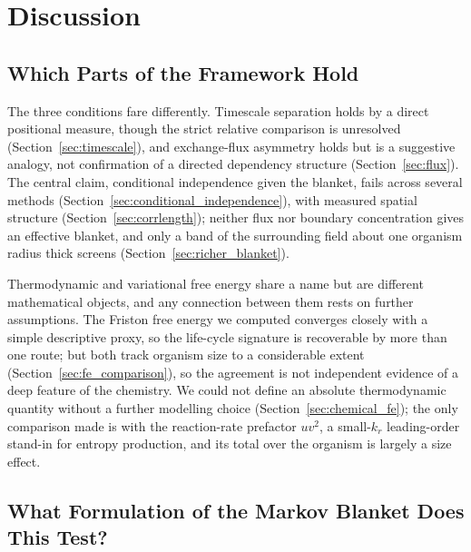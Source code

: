 \documentclass[11pt]{article}
\begin{document}
\section{Discussion}
\label{sec:discussion}

\subsection{Which Parts of the Framework Hold}

The three conditions fare differently. Timescale separation holds by a direct positional measure, though the strict relative comparison is unresolved (Section~\ref{sec:timescale}), and exchange-flux asymmetry holds but is a suggestive analogy, not confirmation of a directed dependency structure (Section~\ref{sec:flux}). The central claim, conditional independence given the blanket, fails across several methods (Section~\ref{sec:conditional_independence}), with measured spatial structure (Section~\ref{sec:corrlength}); neither flux nor boundary concentration gives an effective blanket, and only a band of the surrounding field about one organism radius thick screens (Section~\ref{sec:richer_blanket}).

Thermodynamic and variational free energy share a name but are different mathematical objects, and any connection between them rests on further assumptions. The Friston free energy we computed converges closely with a simple descriptive proxy, so the life-cycle signature is recoverable by more than one route; but both track organism size to a considerable extent (Section~\ref{sec:fe_comparison}), so the agreement is not independent evidence of a deep feature of the chemistry. We could not define an absolute thermodynamic quantity without a further modelling choice (Section~\ref{sec:chemical_fe}); the only comparison made is with the reaction-rate prefactor $uv^2$, a small-$k_r$ leading-order stand-in for entropy production, and its total over the organism is largely a size effect.

\subsection{What Formulation of the Markov Blanket Does This Test?}
\label{sec:blanket_formulation}
\end{document}
